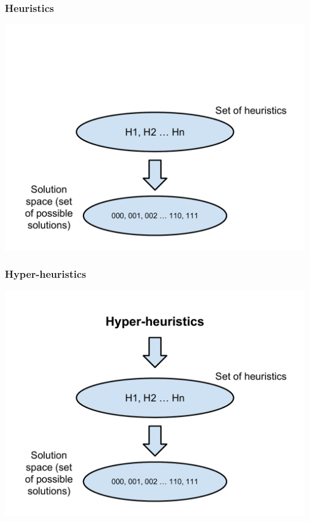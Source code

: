 \documentclass{beamer}
\begin{document}
\begin{frame}
	\centering
	\frametitle{Heuristics}
	\includegraphics[height=.8\textheight]{Illustrations/heuristic_1.PDF}
	\\
\end{frame}

\begin{frame}
	\centering
	\frametitle{Hyper-heuristics}
	\includegraphics[height=.8\textheight]{Illustrations/heuristic_2.PDF}
	\\
\end{frame}
\end{document}
